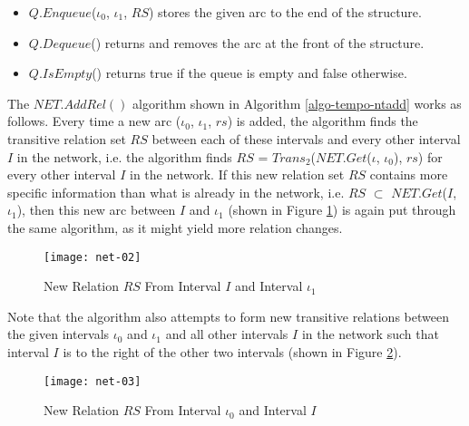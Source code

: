 \documentclass[11pt]{report}
\begin{document}
          \begin{itemize}
            \item
              $Q.Enqueue$($\iota_0$, $\iota_1$, $RS$) stores the given arc to
              the end of the structure.

            \item
              $Q.Dequeue$() returns and removes the arc at the front of the
              structure.

            \item
              $Q.IsEmpty$() returns true if the queue is empty and false
              otherwise.
          \end{itemize}

          The $NET.AddRel()$ algorithm shown in Algorithm
          \ref{algo-tempo-ntadd} works as follows. Every time a new arc
          ($\iota_0$, $\iota_1$, $rs$) is added, the algorithm finds the
          transitive relation set $RS$ between each of these intervals and
          every other interval $I$ in the network, i.e. the algorithm finds
          $RS$ = $Trans_2$($NET.Get$($\iota$, $\iota_0$), $rs$) for every other
          interval $I$ in the network. If this new relation set $RS$
          contains more specific information than what is already in the
          network, i.e. $RS$ $\subset$ $NET.Get$($I$, $\iota_1$), then this new
          arc between $I$ and $\iota_1$ (shown in Figure
          \ref{figu-tempo-ntwk2}) is again put through the same algorithm, as
          it might yield more relation changes.

          \begin{figure}[tbhp]
            \begin{center}
              \texttt{[image: net-02]}
              \caption{New Relation $RS$ From Interval $I$ and Interval $\iota_1$}
              \label{figu-tempo-ntwk2}
            \end{center}
          \end{figure}

          Note that the algorithm also attempts to form new transitive
          relations between the given intervals $\iota_0$ and $\iota_1$ and all
          other intervals $I$ in the network such that interval $I$ is to the
          right of the other two intervals (shown in Figure
          \ref{figu-tempo-ntwk3}).

          \begin{figure}[tbhp]
            \begin{center}
              \texttt{[image: net-03]}
              \caption{New Relation $RS$ From Interval $\iota_0$ and Interval $I$}
              \label{figu-tempo-ntwk3}
            \end{center}
          \end{figure}
\end{document}
